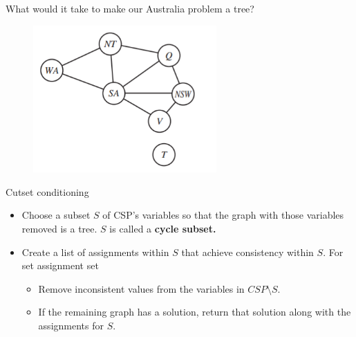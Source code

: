 \documentclass{beamer}
\begin{document}
\begin{frame}{What would it take to make our Australia problem a tree?}
    \begin{figure}
        \includegraphics[width=7cm]{images/map_graph}
    \end{figure}
    
\end{frame}

\begin{frame}{Cutset conditioning}
    \begin{itemize}
        \item Choose a subset $S$ of CSP's variables so that the graph with those
        variables removed is a tree. $S$ is called a {\bf cycle subset.}
        \item Create a list of assignments within $S$ that achieve consistency within $S$. For set assignment set
        \begin{itemize}
            \item Remove inconsistent values from the variables in $CSP\setminus S$.
            \item If the remaining graph has a solution, return that solution along with the assignments for $S$.
        \end{itemize}
    \end{itemize}
    
\end{frame}
\end{document}
